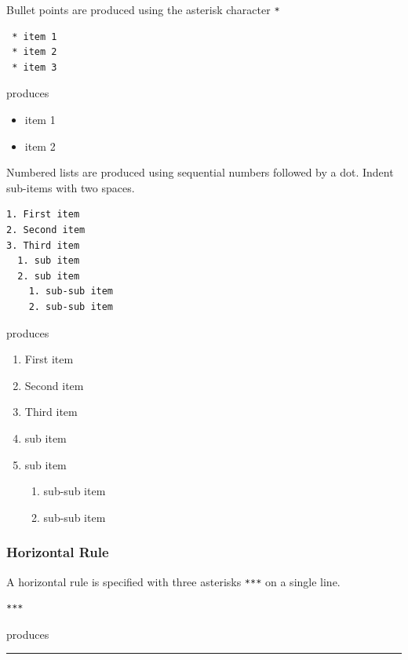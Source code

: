 \documentclass{book}
\providecommand{\tightlist}{%
      \setlength{\itemsep}{0pt}\setlength{\parskip}{0pt}}
\begin{document}
Bullet points are produced using the asterisk character \lstinline!*!

\begin{lstlisting}
 * item 1
 * item 2
 * item 3
\end{lstlisting}

produces

\begin{itemize}
\tightlist
\item
  item 1
\item
  item 2
\end{itemize}

Numbered lists are produced using sequential numbers followed by a dot.
Indent sub-items with two spaces.

\begin{lstlisting}
1. First item
2. Second item
3. Third item
  1. sub item
  2. sub item
    1. sub-sub item
    2. sub-sub item
\end{lstlisting}

produces

\begin{enumerate}
\def\labelenumi{\arabic{enumi}.}
\tightlist
\item
  First item
\item
  Second item
\item
  Third item
\item
  sub item
\item
  sub item

  \begin{enumerate}
  \def\labelenumii{\arabic{enumii}.}
  \tightlist
  \item
    sub-sub item
  \item
    sub-sub item
  \end{enumerate}
\end{enumerate}

\subsubsection{Horizontal Rule}\label{horizontal-rule}

A horizontal rule is specified with three asterisks \lstinline!***! on a
single line.

\begin{lstlisting}
***
\end{lstlisting}

produces

\begin{center}\rule{0.5\linewidth}{\linethickness}\end{center}
\end{document}
